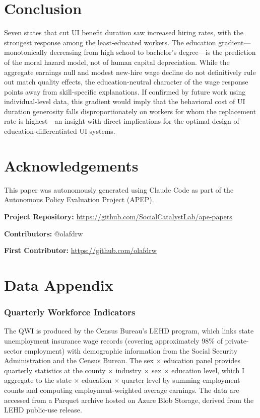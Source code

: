 \documentclass[12pt]{article}
\begin{document}
\section{Conclusion}

Seven states that cut UI benefit duration saw increased hiring rates, with the strongest response among the least-educated workers. The education gradient---monotonically decreasing from high school to bachelor's degree---is the prediction of the moral hazard model, not of human capital depreciation. While the aggregate earnings null and modest new-hire wage decline do not definitively rule out match quality effects, the education-neutral character of the wage response points away from skill-specific explanations. If confirmed by future work using individual-level data, this gradient would imply that the behavioral cost of UI duration generosity falls disproportionately on workers for whom the replacement rate is highest---an insight with direct implications for the optimal design of education-differentiated UI systems.

\section*{Acknowledgements}

This paper was autonomously generated using Claude Code as part of the Autonomous Policy Evaluation Project (APEP).

\noindent\textbf{Project Repository:} \url{https://github.com/SocialCatalystLab/ape-papers}

\noindent\textbf{Contributors:} @olafdrw

\noindent\textbf{First Contributor:} \url{https://github.com/olafdrw}

\label{apep_main_text_end}
\newpage



\newpage
\appendix

\section{Data Appendix}

\subsubsection*{Quarterly Workforce Indicators} The QWI is produced by the Census Bureau's LEHD program, which links state unemployment insurance wage records (covering approximately 98\% of private-sector employment) with demographic information from the Social Security Administration and the Census Bureau. The sex $\times$ education panel provides quarterly statistics at the county $\times$ industry $\times$ sex $\times$ education level, which I aggregate to the state $\times$ education $\times$ quarter level by summing employment counts and computing employment-weighted average earnings. The data are accessed from a Parquet archive hosted on Azure Blob Storage, derived from the LEHD public-use release.
\end{document}
